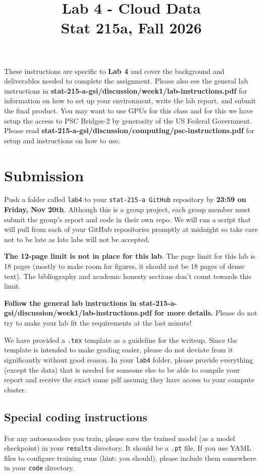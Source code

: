 \documentclass[letterpaper,12pt]{article}
\title{Lab 4 - Cloud Data\\Stat 215a, Fall 2026\vspace{-2em}}
\date{}
\begin{document}
\maketitle

These instructions are specific to \textbf{Lab 4} and cover the background and deliverables needed to complete the assignment. Please also see the general lab instructions in \textbf{stat-215-a-gsi/discussion/week1/lab-instructions.pdf} for information on how to set up your environment, write the lab report, and submit the final product. You may want to use GPUs for this class and for this we have setup the access to PSC Bridges-2 by generosity of the US Federal Government. Please read \textbf{stat-215-a-gsi/discussion/computing/psc-instructions.pdf} for setup and instructions on how to use.

\tableofcontents

\section{Submission}
Push a folder called \texttt{lab4} to your \texttt{stat-215-a GitHub} repository by \textbf{23:59 on Friday, Nov 20th}. Although this is a group project, each group member must submit the group's report and code in their own repo. We will run a script that will pull from each of your GitHub repositories promptly at midnight so take care not to be late as late labs will not be accepted.

\textbf{The 12-page limit is not in place for this lab}. The page limit for this lab is 18 pages (mostly to make room for figures, it should not be 18 pages of dense text). The bibliography and academic honesty sections don't count towards this limit.

\textbf{Follow the general lab instructions in stat-215-a-gsi/discussion/week1/lab-instructions.pdf for more details.} Please do not try to make your lab fit the requirements at the last minute!

We have provided a \texttt{.tex} template as a guideline for the writeup. Since the template is intended to make grading easier, please do not deviate from it significantly without good reason. In your \texttt{lab4} folder, please provide everything (except the data) that is needed for someone else to be able to compile your report and receive the exact same pdf assumig they have access to your compute cluster.

\subsection{Special coding instructions}
For any autoencoders you train, please save the trained model (as a model checkpoint) in your \texttt{results} directory. It should be a \texttt{.pt} file. If you use YAML files to configure training runs (hint: you should), please include them somewhere in your \texttt{code} directory.
\end{document}
